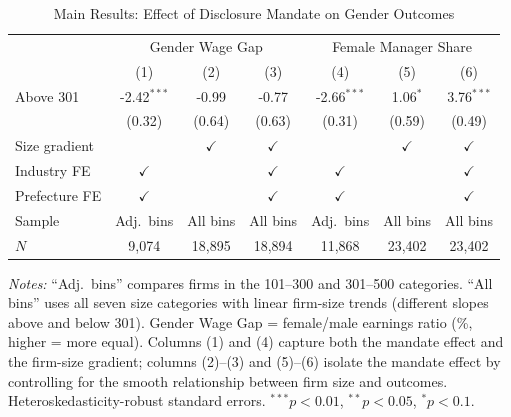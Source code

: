 \begin{table}[t]
\centering
\caption{Main Results: Effect of Disclosure Mandate on Gender Outcomes}
\label{tab:main}
\begin{tabular}{lcccccc}
\hline\hline
 & \multicolumn{3}{c}{Gender Wage Gap} & \multicolumn{3}{c}{Female Manager Share} \\
 & (1) & (2) & (3) & (4) & (5) & (6) \\
\hline
Above 301 & -2.42$^{***}$ & -0.99 & -0.77 & -2.66$^{***}$ & 1.06$^{*}$ & 3.76$^{***}$ \\
 & (0.32) & (0.64) & (0.63) & (0.31) & (0.59) & (0.49) \\
\hline
Size gradient & & $\checkmark$ & $\checkmark$ & & $\checkmark$ & $\checkmark$ \\
Industry FE & $\checkmark$ & & $\checkmark$ & $\checkmark$ & & $\checkmark$ \\
Prefecture FE & $\checkmark$ & & $\checkmark$ & $\checkmark$ & & $\checkmark$ \\
Sample & Adj.\ bins & All bins & All bins & Adj.\ bins & All bins & All bins \\
$N$ & 9,074 & 18,895 & 18,894 & 11,868 & 23,402 & 23,402 \\
\hline\hline
\end{tabular}
\begin{tablenotes}\small
\item \textit{Notes:} ``Adj.\ bins'' compares firms in the 101--300 and 301--500 categories. ``All bins'' uses all seven size categories with linear firm-size trends (different slopes above and below 301). Gender Wage Gap = female/male earnings ratio (\%, higher = more equal). Columns (1) and (4) capture both the mandate effect and the firm-size gradient; columns (2)--(3) and (5)--(6) isolate the mandate effect by controlling for the smooth relationship between firm size and outcomes. Heteroskedasticity-robust standard errors. $^{***}p<0.01$, $^{**}p<0.05$, $^{*}p<0.1$.
\end{tablenotes}
\end{table}

